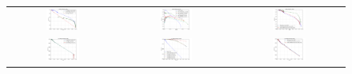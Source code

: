 \begin{figure}[ht!]
\begin{center}
\begin{tabular}{c|c|c}
  \includegraphics[width=0.32\textwidth,trim=1cm 0cm 1.5cm 0cm,clip]{plots/votingconfidencepercentage.png} & 
\includegraphics[width=0.32\textwidth,trim=1cm 0cm 1.5cm 0cm,clip]{plots/rawvsbest.png} &
\includegraphics[width=0.32\textwidth,trim=1cm 0cm 1.5cm 0cm,clip]{plots/filtered_ml_vis_snow.png}\\
\includegraphics[width=0.32\textwidth,trim=0.7cm 0cm 1.5cm 0cm,clip]{plots/votingconfidencepercentagenosnow.png} & 
\includegraphics[width=0.32\textwidth,trim=0.7cm 0cm 1.5cm 0cm,clip]{plots/rawvsbestnosnow.png} &
\includegraphics[width=0.32\textwidth,trim=0.7cm 0cm 1.5cm 0cm,clip]{plots/filtered_ml_vis_no_snow.png}\\

\end{tabular}
\end{center}
\end{figure}

